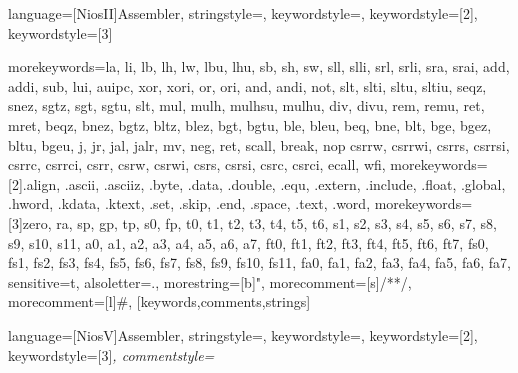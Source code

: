    
    {
   language=[NiosII]{Assembler},
   stringstyle=\color{niosStringColour},
   keywordstyle=\color{niosInstructionColour},
   keywordstyle=[2]\color{niosDirectiveColour},
   keywordstyle=[3]\itshape\color{niosSpecialRegColour}
   }

 {
 	morekeywords={la, li, lb, lh, lw, lbu, lhu, sb, sh, sw, sll, slli, srl, srli, sra, srai,
    add, addi, sub, lui, auipc, xor, xori, or, ori, and, andi, not, slt, slti, sltu, sltiu,
    seqz, snez, sgtz, sgt, sgtu, slt, mul, mulh, mulhsu, mulhu, div, divu, rem, remu,
    ret, mret, beqz, bnez, bgtz, bltz, blez, bgt, bgtu, ble, bleu,
    beq, bne, blt, bge, bgez, bltu, bgeu, j, jr, jal, jalr, mv, neg, ret, scall, break, nop
    csrrw, csrrwi, csrrs, csrrsi, csrrc, csrrci, csrr, csrw, csrwi, csrs, csrsi, csrc,
    csrci, ecall, wfi},%
 	morekeywords=[2]{.align, .ascii, .asciiz, .byte, .data, .double, .equ, .extern, .include,
    .float, .global, .hword, .kdata, .ktext, .set, .skip, .end, .space, .text, .word},%
 	morekeywords=[3]{zero, ra, sp, gp, tp, s0, fp, t0, t1, t2, t3, t4, t5, t6,
    s1, s2, s3, s4, s5, s6, s7, s8, s9, s10, s11, a0, a1, a2, a3, a4, a5, a6, a7,
    ft0, ft1, ft2, ft3, ft4, ft5, ft6, ft7, fs0, fs1, fs2, fs3, fs4, fs5, fs6, fs7, 
    fs8, fs9, fs10, fs11, fa0, fa1, fa2, fa3, fa4, fa5, fa6, fa7},%
 	sensitive=t,%
 	alsoletter=.,%
	morestring=[b]",%
 	morecomment=[s]{/*}{*/},%
 	morecomment=[l]\#,%
   }[keywords,comments,strings]
   
   
   
    {
   language=[NiosV]{Assembler},
   stringstyle=\color{niosVStringColour},
   keywordstyle=\color{niosVInstructionColour},
   keywordstyle=[2]\color{niosVDirectiveColour},
   keywordstyle=[3]\itshape\color{niosVSpecialRegColour},
   commentstyle=\small\color{brown}\ttfamily
   }

